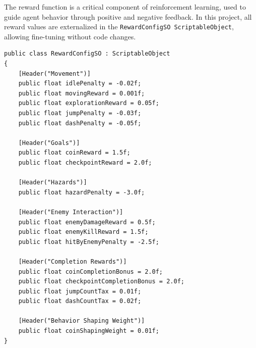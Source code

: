 \documentclass[12pt,oneside,openright,a4paper]{cpe-english-project}
\begin{document}
The reward function is a critical component of reinforcement learning, used to guide agent behavior through positive and negative feedback. In this project, all reward values are externalized in the \texttt{RewardConfigSO ScriptableObject}, allowing fine-tuning without code changes.
\begin{lstlisting}[language={[Sharp]C}]
public class RewardConfigSO : ScriptableObject
{
	[Header("Movement")]
	public float idlePenalty = -0.02f;
	public float movingReward = 0.001f;
	public float explorationReward = 0.05f;
	public float jumpPenalty = -0.03f;
	public float dashPenalty = -0.05f;

	[Header("Goals")]
	public float coinReward = 1.5f;
	public float checkpointReward = 2.0f;

	[Header("Hazards")]
	public float hazardPenalty = -3.0f;

	[Header("Enemy Interaction")]
	public float enemyDamageReward = 0.5f;
	public float enemyKillReward = 1.5f;
	public float hitByEnemyPenalty = -2.5f;

	[Header("Completion Rewards")]
	public float coinCompletionBonus = 2.0f;
	public float checkpointCompletionBonus = 2.0f;
	public float jumpCountTax = 0.01f;
	public float dashCountTax = 0.02f;

	[Header("Behavior Shaping Weight")]
	public float coinShapingWeight = 0.01f;
}
\end{lstlisting}
\end{document}
